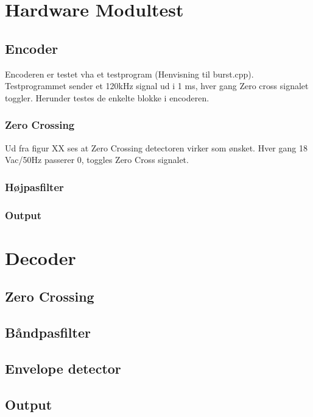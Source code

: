 \section{Hardware Modultest}

\subsection{Encoder}
Encoderen er testet vha et testprogram (Henvisning til burst.cpp). Testprogrammet sender et 120kHz signal ud i 1 ms, hver gang Zero cross signalet toggler. Herunder testes de enkelte blokke i encoderen.    


\subsubsection{Zero Crossing}

Ud fra figur XX ses at Zero Crossing detectoren virker som ønsket. Hver gang 18 Vac/50Hz passerer 0, toggles Zero Cross signalet. 

\subsubsection{Højpasfilter}

\subsubsection{Output}

\section{Decoder}

\subsection{Zero Crossing}


\subsection{Båndpasfilter}

\subsection{Envelope detector}

\subsection{Output}


\clearpage